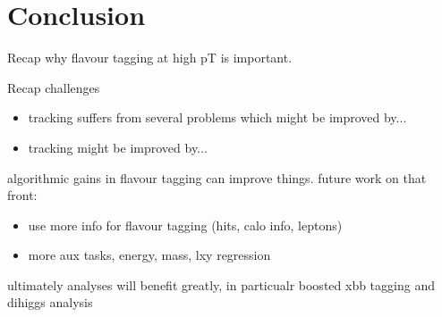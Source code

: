 \chapter{Conclusion}
\label{chap:conclusion}

Recap why flavour tagging at high pT is important.

Recap challenges
\begin{itemize}
    \item tracking suffers from several problems which might be improved by...
    \item tracking might be improved by...
\end{itemize}

algorithmic gains in flavour tagging can improve things. future work on that front:
\begin{itemize}
    \item use more info for flavour tagging (hits, calo info, leptons)
    \item more aux tasks, energy, mass, lxy regression
\end{itemize}

ultimately analyses will benefit greatly, in particualr boosted xbb tagging and dihiggs analysis

